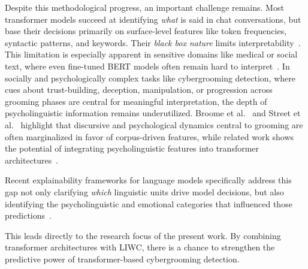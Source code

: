 Despite this methodological progress, an important challenge remains. Most transformer models succeed at identifying \emph{what} is said in chat conversations, but base their decisions primarily on surface-level features like token frequencies, syntactic patterns, and keywords. Their \textit{black box nature} limits interpretability~\cite{mersha2025explainabilityneuralnetworksnatural,lokesh2025xai}. This limitation is especially apparent in sensitive domains like medical or social text, where even fine-tuned BERT models often remain hard to interpret~\cite{talebi2024exploring}. In socially and psychologically  complex tasks like cybergrooming detection, where cues about trust-building, deception, manipulation, or progression across grooming phases are central for meaningful interpretation, the depth of psycholinguistic information remains underutilized. Broome et al.~\cite{broome2020psycholinguistic} and Street et al.~\cite{street2024grooming} highlight that discursive and psychological dynamics central to grooming are often marginalized in favor of corpus-driven features, while related work shows the potential of integrating psycholinguistic features into transformer architectures~\cite{maharjan2025llmliwc,zwanwar2022emotion,kerz2022transformers}.

Recent explainability frameworks for language models specifically address this gap not only clarifying \emph{which} linguistic units drive model decisions, but also identifying the psycholinguistic and emotional categories that influenced those predictions~\cite{maharjan2025llmliwc,zwanwar2022emotion,lokesh2025xai,ribeiro2024methodologyexplainablelargelanguage}.

This leads directly to the research focus of the present work. By combining transformer architectures with LIWC, there is a chance to strengthen the predictive power of transformer-based cybergrooming detection.


